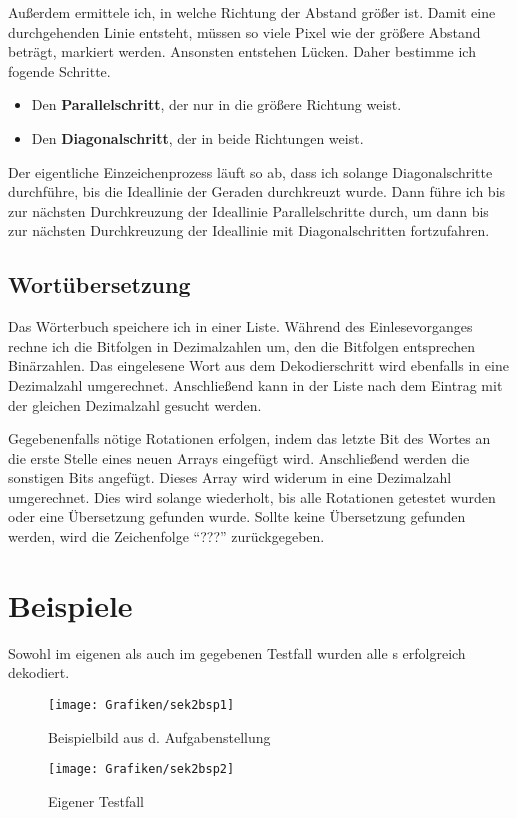 Außerdem ermittele ich, in welche Richtung der Abstand größer ist.
Damit eine durchgehenden Linie entsteht, müssen so viele Pixel wie der größere Abstand beträgt, markiert werden. Ansonsten entstehen Lücken. Daher bestimme ich fogende Schritte.
\begin{itemize}
	\item Den \textbf{Parallelschritt}, der nur in die größere Richtung weist. 
	\item Den \textbf{Diagonalschritt}, der in beide Richtungen weist.
\end{itemize}

Der eigentliche Einzeichenprozess läuft so ab, dass ich solange Diagonalschritte durchführe, bis die Ideallinie der Geraden durchkreuzt wurde. Dann führe ich bis zur nächsten Durchkreuzung der Ideallinie Parallelschritte durch, um dann bis zur nächsten Durchkreuzung der Ideallinie mit Diagonalschritten fortzufahren.

\subsection{Wortübersetzung}
Das Wörterbuch speichere ich in einer Liste. Während des Einlesevorganges rechne ich die Bitfolgen in Dezimalzahlen um, den die Bitfolgen entsprechen Binärzahlen.
Das eingelesene Wort aus dem Dekodierschritt wird ebenfalls in eine Dezimalzahl umgerechnet. Anschließend kann in der Liste nach dem Eintrag mit der gleichen Dezimalzahl gesucht werden.

Gegebenenfalls nötige Rotationen erfolgen, indem das letzte Bit des Wortes an die erste Stelle eines neuen Arrays eingefügt wird. Anschließend werden die sonstigen Bits angefügt.
Dieses Array wird widerum in eine Dezimalzahl umgerechnet. Dies wird solange wiederholt, bis alle Rotationen getestet wurden oder eine Übersetzung gefunden wurde.
Sollte keine Übersetzung gefunden werden, wird die Zeichenfolge "`???"' zurückgegeben. 

\pagebreak
\section{Beispiele}
Sowohl im eigenen als auch im gegebenen Testfall wurden alle \task{}s erfolgreich dekodiert.
\begin{figure}[!ht]
	\centering	
	\texttt{[image: Grafiken/sek2bsp1]}
	\caption{Beispielbild aus d. Aufgabenstellung}
\end{figure}
\vfill{}
\begin{figure}[!ht]
	\centering	
	\texttt{[image: Grafiken/sek2bsp2]}
	\caption{Eigener Testfall}
\end{figure}
